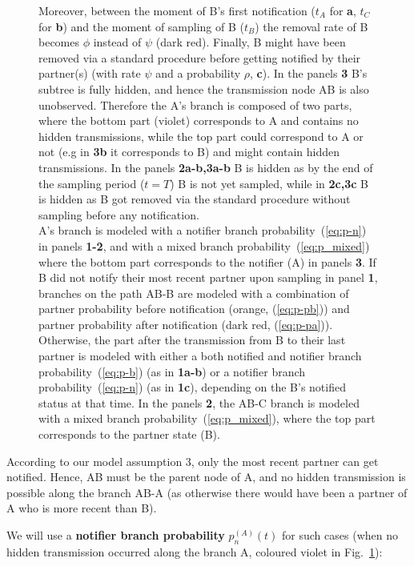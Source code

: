 \documentclass[10pt,letterpaper]{article}
\begin{document}
\begin{figure}[h!]
{Moreover, between the moment of B's first notification ($t_A$ for \textbf{a}, $t_C$ for \textbf{b}) and the moment of sampling  of B ($t_B$) the removal rate of B becomes $\phi$ instead of $\psi$ (dark red).
Finally, B might have been removed via a standard procedure before getting notified by their partner(s) (with rate $\psi$ and a probability $\rho$, \textbf{c}).
In the panels \textbf{3} B's subtree is fully hidden, and hence the transmission node AB is also unobserved. Therefore the A's branch is composed of two parts, where the bottom part (violet) corresponds to A and contains no hidden transmissions, while the top part could correspond to A or not  (e.g in \textbf{3b} it corresponds to B) and might contain hidden transmissions. 
In the panels \textbf{2a-b,3a-b} B is hidden as by the end of the sampling period ($t=T$) B is not yet sampled, while in \textbf{2c,3c} B is hidden as B got removed via the standard procedure without sampling before any notification.
\\
A's branch is modeled with a notifier branch probability~(\ref{eq:p-n}) in panels \textbf{1-2}, and with a mixed branch probability~(\ref{eq:p_mixed}) where the bottom part corresponds to the notifier (A) in panels \textbf{3}. If B did not notify their most recent partner upon sampling in panel \textbf{1}, branches on the path AB-B are modeled with a combination of partner probability before notification (orange, (\ref{eq:p-pb})) and partner probability after notification (dark red, (\ref{eq:p-pa})). Otherwise, the part after the transmission from B to their last partner is modeled with either a both notified and notifier branch probability~(\ref{eq:p-b}) (as in \textbf{1a-b}) or a notifier branch probability~(\ref{eq:p-n}) (as in \textbf{1c}), depending on the B's notified status at that time. In the panels \textbf{2}, the AB-C branch is modeled with a mixed branch probability~(\ref{eq:p_mixed}), where the top part corresponds to the partner state (B).
}
\label{fig:pn-branches} 
\end{figure}


According to our model assumption 3, only the most recent partner can get notified. Hence, AB must be the parent node of A, and no hidden transmission is possible along the branch AB-A (as otherwise there would have been a partner of A who is more recent than B).

We will use a \textbf{notifier branch probability} $p_n^{(A)}(t)$ for such cases (when no hidden transmission occurred along the branch A, coloured violet in Fig.~\ref{fig:pn-branches}):
\end{document}
